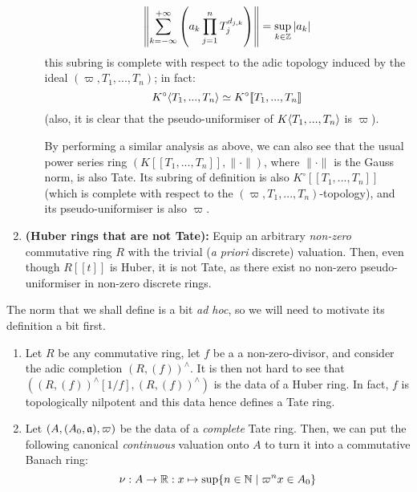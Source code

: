 \begin{example}
\begin{enumerate}
\begin{itemize}
                                    $$\left\|\sum_{k = -\infty}^{+\infty} \left(a_k \prod_{j = 1}^n T_j^{d_{j, k}}\right)\right\| = \sup_{k \in \mathbb{Z}} |a_k|$$
                                this subring is complete with respect to the adic topology induced by the ideal $(\varpi, T_1, ..., T_n)$; in fact:
                                    $$K^{\circ}\langle T_1, ..., T_n\rangle \simeq K^{\circ}[\![T_1, ..., T_n]\!]$$
                                (also, it is clear that the pseudo-uniformiser of $K\langle T_1, ..., T_n\rangle$ is $\varpi$).
                                
                                By performing a similar analysis as above, we can also see that the usual power series ring $(K[\![T_1, ..., T_n]\!], \|\cdot\|)$, where $\|\cdot\|$ is the Gauss norm, is also Tate. Its subring of definition is also $K^{\circ}[\![T_1, ..., T_n]\!]$ (which is complete with respect to the $(\varpi, T_1, ..., T_n)$-topology), and its pseudo-uniformiser is also $\varpi$.         
                            \end{itemize}
                        \item \textbf{(Huber rings that are not Tate):} Equip an arbitrary \textit{non-zero} commutative ring $R$ with the trivial (\textit{a priori} discrete) valuation. Then, even though $R[\![t]\!]$ is Huber, it is not Tate, as there exist no non-zero pseudo-uniformiser in non-zero discrete rings.  
                    \end{enumerate}
                \end{example}
                \begin{remark} \label{remark: canonical_norm_for_tate_rings}
                    The norm that we shall define is a bit \textit{ad hoc}, so we will need to motivate its definition a bit first.
                    \begin{enumerate}
                        \item Let $R$ be any commutative ring, let $f$ be a a non-zero-divisor, and consider the adic completion $(R, (f))^{\wedge}$. It is then not hard to see that $\left((R, (f))^{\wedge}[1/f], (R, (f))^{\wedge}\right)$ is the data of a Huber ring. In fact, $f$ is topologically nilpotent and this data hence defines a Tate ring. 
                        \item Let $(A, (A_0, \mathfrak{a}), \varpi)$ be the data of a \textit{complete} Tate ring. Then, we can put the following canonical \textit{continuous} valuation onto $A$ to turn it into a commutative Banach ring:
                            $$\nu: A \to \mathbb{R}: x \mapsto \sup\{n \in \mathbb{N} \mid \varpi^n x \in A_0\}$$
                    
                    \end{enumerate}
                \end{remark}
                
